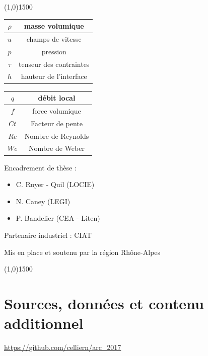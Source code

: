 \documentclass[a0,portrait,11pt]{a0poster}
\begin{document}
\begin{center}
    \line(1,0){1500}
\end{center}

\begin{multicols}{2}
    \begin{center}
        \begin{tabular}{|c|c|}
            \hline $\rho$ & masse volumique \\
            \hline $u$ & champs de vitesse \\
            \hline $p$ & pression \\
            \hline $\tau$ & tenseur des contraintes \\
            \hline $h$ & hauteur de l'interface \\
            \hline
        \end{tabular}
        \begin{tabular}{|c|c|}
            \hline $q$ & débit local \\
            \hline $f$ & force volumique \\
            \hline $Ct$ & Facteur de pente \\
            \hline $Re$ & Nombre de Reynolds \\
            \hline $W\!e$ & Nombre de Weber \\
            \hline
        \end{tabular}
    \end{center}

        Encadrement de thèse :
        \begin{itemize}
            \item C. Ruyer - Quil (LOCIE)
            \item N. Caney (LEGI)
            \item P. Bandelier (CEA - Liten)
        \end{itemize}

        Partenaire industriel : CIAT

        Mis en place et soutenu par la région Rhône-Alpes
\end{multicols}

\begin{center}
    \line(1,0){1500}
\end{center}



\section*{Sources, données et contenu additionnel}
\url{https://github.com/celliern/arc_2017}
\end{document}
